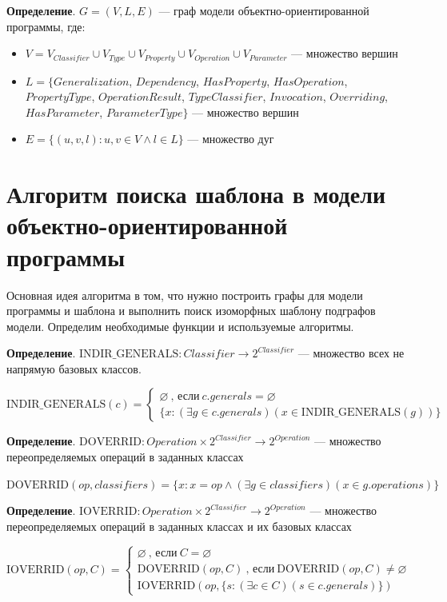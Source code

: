 \textbf{Определение}. $G = (V, L, E)$ --- граф модели объектно-ориентированной программы, где:
\begin{itemize}
\item $V = V_{Classifier} \cup V_{Type} \cup V_{Property} \cup V_{Operation} \cup V_{Parameter}$
--- множество вершин
\item $L = \{ Generalization$, $Dependency$, $HasProperty$, $HasOperation$,
$PropertyType$, $OperationResult$, $TypeClassifier$, $Invocation$, $Overriding$,
$HasParameter$, $ParameterType \}$  --- множество вершин
\item $E = \{ (u, v, l) : u, v \in V \land l \in L \}$ --- множество дуг
\end{itemize}

\section{Алгоритм поиска шаблона в модели объектно-ориентированной программы}

Основная идея алгоритма в том, что нужно построить графы для модели программы
и шаблона и выполнить поиск изоморфных шаблону подграфов модели.
Определим необходимые функции и используемые алгоритмы.

\textbf{Определение}. $\textrm{INDIR\_GENERALS}: Classifier \to 2^{Classifier}$
--- множество всех не напрямую базовых классов.

$\textrm{INDIR\_GENERALS}(c) = \begin{cases}
\varnothing \ \textrm{, если} \ c.generals = \varnothing \\
\{ x : (\exists g \in c.generals)(x \in \textrm{INDIR\_GENERALS}(g)) \}
\end{cases}
$

\textbf{Определение}. $\textrm{DOVERRID}: Operation \times 2^{Classifier} \to 2^{Operation}$
--- множество переопределяемых операций в заданных классах

$\textrm{DOVERRID}(op, classifiers) = \{ x : x = op \land (\exists g \in classifiers)(x \in g.operations) \}$

\textbf{Определение}. $\textrm{IOVERRID}: Operation \times 2^{Classifier} \to 2^{Operation}$
--- множество переопределяемых операций в заданных классах и их базовых классах

$\textrm{IOVERRID}(op, C) = \begin{cases}
\varnothing \ \textrm{, если} \ C = \varnothing \\
\textrm{DOVERRID}(op, C) \ \textrm{, если} \ \textrm{DOVERRID}(op, C) \ne \varnothing \\
\textrm{IOVERRID}(op, \{ s : (\exists c \in C)(s \in c.generals) \})
\end{cases}
$


